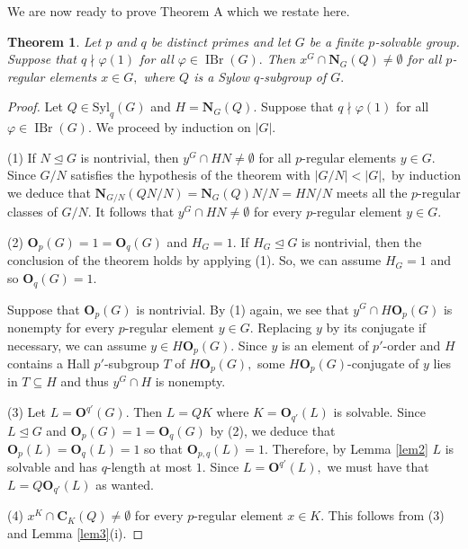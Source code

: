 \documentclass[12pt]{amsart}
\newtheorem{theorem}{Theorem}[section]
\theoremstyle{remark}
\numberwithin{equation}{section}
\begin{document}
We are now ready to prove Theorem A which we restate here.

\begin{theorem}
Let $p$ and $q$ be distinct primes and let $G$ be a finite $p$-solvable group. Suppose that $q\nmid \varphi(1)$ for all $\varphi\in\operatorname{IBr}(G).$ Then $x^G\cap {\mathbf{N}}_G(Q)\neq\emptyset$ for all $p$-regular elements $x\in G,$ where $Q$ is a Sylow $q$-subgroup of $G.$
\end{theorem}

\begin{proof} Let $Q\in{{\mathrm {Syl}}}_q(G)$ and $H={\mathbf{N}}_G(Q).$ Suppose that $q\nmid\varphi(1)$ for all $\varphi\in\operatorname{IBr}(G).$
We proceed by induction on $|G|.$

\medskip
(1) If $N\unlhd G$ is nontrivial, then $y^G\cap HN\neq\emptyset$ for all $p$-regular elements $y\in G.$  Since $G/N$ satisfies the hypothesis of the theorem with $|G/N|<|G|,$ by induction we deduce that ${\mathbf{N}}_{G/N}(QN/N)={\mathbf{N}}_G(Q)N/N=HN/N$ meets all the $p$-regular classes of $G/N.$ It follows that  $y^G\cap HN\neq\emptyset$ for every $p$-regular element $y\in G.$

\medskip
(2) ${\mathbf{O}}_p(G)=1={\mathbf{O}}_q(G)$ and $H_G=1.$  If $H_G\unlhd G$ is nontrivial, then the conclusion of the theorem holds by applying (1). So, we can assume $H_G=1$ and so ${\mathbf{O}}_q(G)=1.$

Suppose that ${\mathbf{O}}_p(G)$ is nontrivial. By (1) again, we see that $y^G\cap H{\mathbf{O}}_p(G)$ is nonempty for every $p$-regular element $y\in G.$ Replacing $y$ by its conjugate if necessary, we can assume $y\in H{\mathbf{O}}_p(G).$ Since $y$ is an element of $p'$-order and $H$ contains a Hall $p'$-subgroup $T$ of $H{\mathbf{O}}_p(G),$ some $H{\mathbf{O}}_p(G)$-conjugate of $y$ lies in $T\subseteq H$ and thus $y^G\cap H$ is nonempty.

\medskip

(3) Let $L={\mathbf{O}}^{q'}(G).$ Then $L=QK$ where $K={\mathbf{O}}_{q'}(L)$ is solvable. Since $L\unlhd G$ and ${\mathbf{O}}_p(G)=1={\mathbf{O}}_q(G)$ by (2), we deduce that ${\mathbf{O}}_p(L)={\mathbf{O}}_q(L)=1$ so that ${\mathbf{O}}_{p,q}(L)=1.$ Therefore, by Lemma \ref{lem2} $L$ is solvable and has $q$-length at most $1.$ Since $L={\mathbf{O}}^{q'}(L),$ we must have that $L=Q{\mathbf{O}}_{q'}(L)$ as wanted.

\medskip
(4) $x^K\cap {\mathbf{C}}_K(Q)\neq\emptyset$ for every $p$-regular element $x\in K.$ This follows from (3) and Lemma \ref{lem3}(i).


\end{proof}
\end{document}
